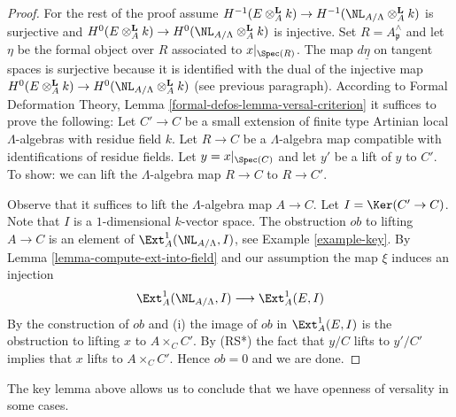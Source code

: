 \begin{proof}
\medskip\noindent
For the rest of the proof assume $H^{-1}(E \otimes_A^\mathbf{L} k) \to
H^{-1}(\NL_{A/\Lambda} \otimes_A^\mathbf{L} k)$
is surjective and
$H^0(E \otimes_A^\mathbf{L} k) \to
H^0(\NL_{A/\Lambda} \otimes_A^\mathbf{L} k)$
is injective. Set $R = A_\mathfrak p^\wedge$ and let $\eta$ be the
formal object over $R$ associated to $x|_{\Spec(R)}$.
The map $d\underline{\eta}$ on tangent spaces is surjective
because it is identified with the dual of the injective map
$H^0(E \otimes_A^{\mathbf{L}} k) \to
H^0(\NL_{A/\Lambda} \otimes_A^{\mathbf{L}} k)$
(see previous paragraph). According to
Formal Deformation Theory, Lemma \ref{formal-defos-lemma-versal-criterion}
it suffices to prove the following:
Let $C' \to C$ be a small extension of finite type Artinian local
$\Lambda$-algebras with residue field $k$. Let $R \to C$ be a
$\Lambda$-algebra map compatible with identifications of residue fields.
Let $y = x|_{\Spec(C)}$ and let $y'$ be a lift of $y$ to $C'$.
To show: we can lift the $\Lambda$-algebra map $R \to C$ to $R \to C'$.

\medskip\noindent
Observe that it suffices to lift the $\Lambda$-algebra map $A \to C$.
Let $I = \Ker(C' \to C)$. Note that $I$ is a $1$-dimensional $k$-vector
space. The obstruction $ob$ to lifting $A \to C$ is an element of
$\Ext^1_A(\NL_{A/\Lambda}, I)$, see Example \ref{example-key}.
By Lemma \ref{lemma-compute-ext-into-field} and our assumption the map
$\xi$ induces an injection
$$
\Ext^1_A(\NL_{A/\Lambda}, I)
\longrightarrow
\Ext^1_A(E, I)
$$
By the construction of $ob$ and (i) the image of $ob$ in $\Ext^1_A(E, I)$
is the obstruction to lifting $x$ to $A \times_C C'$. By (RS*) the fact that
$y/C$ lifts to $y'/C'$ implies that $x$ lifts to $A \times_C C'$. Hence
$ob = 0$ and we are done.
\end{proof}

\noindent
The key lemma above allows us to conclude that we have openness of
versality in some cases.

